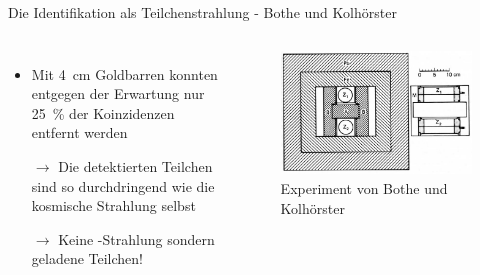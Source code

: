 \documentclass[aspectratio=1610, professionalfonts, 9pt, hyperref={colorlinks=false}]{beamer}
\begin{document}
\begin{frame}{Die Identifikation als Teilchenstrahlung - Bothe und Kolhörster}
  \begin{columns}
      \begin{itemize}
        \setlength\itemsep{0.5em}
        \item Mit \SI{4}{\centi\meter} Goldbarren konnten entgegen der Erwartung nur \SI{25}{\percent} der Koinzidenzen entfernt werden
        \item [$\rightarrow$] Die detektierten Teilchen sind so durchdringend wie die kosmische Strahlung selbst
        \item [$\rightarrow$] Keine \gamma-Strahlung sondern geladene Teilchen!
      \end{itemize}
        \vspace*{10px}
  
      \begin{figure}
          \centering
          \includegraphics[width=\linewidth]{images/The-experiment-of-Bothe-and-Kolhoerster-in-Ref-48-Coincidences-between-counters-Z-1.png}
          \caption{Experiment von Bothe und Kolhörster \cite{ko}}
      \end{figure}
  \end{columns}
\end{frame}
\end{document}

